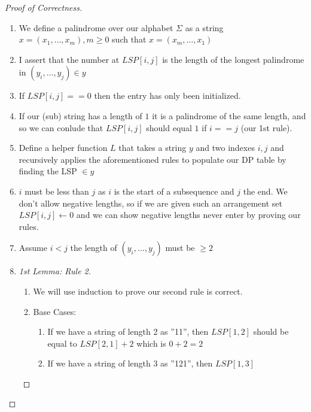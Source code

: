 \documentclass{article}
\begin{document}
\begin{proof}[Proof of Correctness]
      \begin{enumerate}
            \item We define a palindrome over our alphabet \(\Sigma \) as a string
                  \(x = (x_1,\dots, x_m), m \geq 0\)  such that \(x = (x_m,\dots, x_1)\)
            \item I assert that the number at \(LSP[i,j]\) is the length of the longest palindrome in
                  \((y_i,\dots,y_j)\in y\)
            \item If \(LSP[i,j] == 0\)  then the entry has only been initialized.
            \item If our (sub) string has a length of \(1\)  it is a palindrome of the same length,
                  and so we can conlude that \(LSP[i,j]\) should equal \(1\) if \(i == j\) (our 1st rule).
            \item Define a helper function \(L\) that takes a string \(y\) and two indexes \(i,j\)
                  and recursively applies the aforementioned rules to populate our DP table by
                  finding the LSP \(\in y\)
            \item \(i\) must be less than \(j\)  as \(i\) is the start of a subsequence and \(j\) the end.
                  We don't allow negative lengths, so if we are given such an arrangement set
                  \(LSP[i,j] \leftarrow 0\)  and we can show negative lengths never enter by proving our rules.
            \item Assume \(i < j\)  the length of \((y_i,\dots,y_j)\) must be \(\geq 2\)
            \item
                  \begin{proof}[1st Lemma: Rule 2]
                        \begin{enumerate}
                              \item We will use induction to prove our second rule is
                                    correct.
                              \item Base Cases: \begin{enumerate}
                                          \item If we have a string of length 2 as ''11'', then \(LSP[1,2]\) should
                                                be equal to \(LSP[2,1]+2\) which is \(0+2=2\)
                                          \item If we have a string of length 3 as ''121'', then \(LSP[1,3]\)

\end{enumerate}
\end{enumerate}
\end{proof}
\end{enumerate}
\end{proof}
\end{document}
